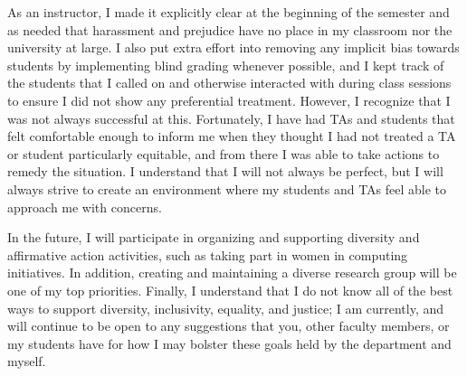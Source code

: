 As an instructor, I made it explicitly clear at the beginning of the semester and as needed that harassment and prejudice have no place in my classroom nor the university at large. I also put extra effort into removing any implicit bias towards students by implementing blind grading whenever possible, and I kept track of the students that I called on and otherwise interacted with during class sessions to ensure I did not show any preferential treatment. However, I recognize that I was not always successful at this. Fortunately, I have had TAs and students that felt comfortable enough to inform me when they thought I had not treated a TA or student particularly equitable, and from there I was able to take actions to remedy the situation. I understand that I will not always be perfect, but I will always strive to create an environment where my students and TAs feel able to approach me with concerns.

In the future, I will participate in organizing and supporting diversity and affirmative action activities, such as taking part in women in computing initiatives. In addition, creating and maintaining a diverse research group will be one of my top priorities. Finally, I understand that I do not know all of the best ways to support diversity, inclusivity, equality, and justice; I am currently, and will continue to be open to any suggestions that you, other faculty members, or my students have for how I may bolster these goals held by the department and myself.

\label{diversity_last}
